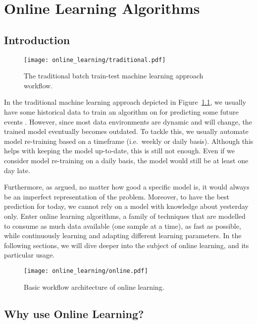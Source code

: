 \chapter{Online Learning Algorithms}
\label{ch:online-learning}

\section{Introduction}

\begin{figure}
  \texttt{[image: online\_learning/traditional.pdf]}
  \caption{The traditional batch train-test machine learning approach workflow.}
  \label{fig:traditional_ml}
\end{figure}

In the traditional machine learning approach depicted in Figure~\ref{fig:traditional_ml}, we usually have some historical data to train an algorithm on for predicting some future events \citep{oza_online_2005}. However, since most data environments are dynamic and will change, the trained model eventually becomes outdated. To tackle this, we usually automate model re-training based on a timeframe (i.e.\ weekly or daily basis). Although this helps with keeping the model up-to-date, this is still not enough. Even if we consider model re-training on a daily basis, the model would still be at least one day late. 

Furthermore, as \citet{pagels_what_2018} argued, no matter how good a specific model is, it would always be an imperfect representation of the problem. Moreover, to have the best prediction for today, we cannot rely on a model with knowledge about yesterday only. Enter online learning algorithms, a family of techniques that are modelled to consume as much data available (one sample at a time), as fast as possible, while continuously learning and adapting different learning parameters. In the following sections, we will dive deeper into the subject of online learning, and its particular usage.

\begin{figure}
  \texttt{[image: online\_learning/online.pdf]}
  \caption{Basic workflow architecture of online learning.}
  \label{fig:online_ml}
\end{figure}

\section{Why use Online Learning?}


